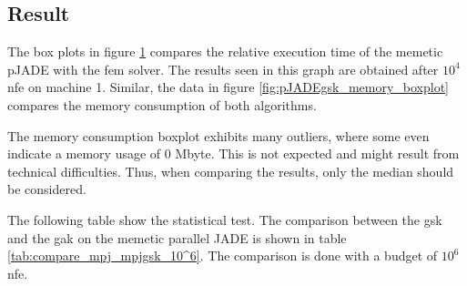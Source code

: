 \documentclass[./\jobname.tex]{subfiles}
\begin{document}
\subsection{Result}

The box plots in figure \ref{fig:pJADEgsk_time_boxplot} compares the relative execution time of the memetic pJADE with the \gls{fem} solver. The results seen in this graph are obtained after $10^4$ \gls{nfe} on machine 1. Similar, the data in figure \ref{fig:pJADEgsk_memory_boxplot} compares the memory consumption of both algorithms. 

The memory consumption boxplot exhibits many outliers, where some even indicate a memory usage of 0 Mbyte. This is not expected and might result from technical difficulties. Thus, when comparing the results, only the median should be considered. 

The following table show the statistical test. The comparison between the \gls{gsk} and the \gls{gak} on the memetic parallel JADE is shown in table \ref{tab:compare_mpj_mpjgsk_10^6}. The comparison is done with a budget of $10^6$ \gls{nfe}. 

\begin{figure}[H]
	\centering
	\noindent{}
	\label{fig:pJADEgsk_time_boxplot}
\end{figure}
\end{document}
